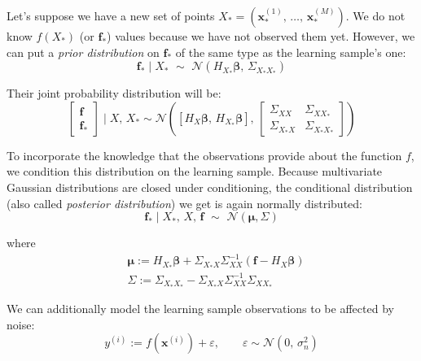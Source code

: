 \noindent
Let's suppose we have a new set of points $X_{*}=(\mathbf{x}_{*}^{(1)},\,\dots,\,\mathbf{x}_{*}^{(M)})$. We do not know $f(X_{*})$ (or $\mathbf{f}_{*}$) values because we have not observed them yet. However, we can put a \textit{prior distribution} on $\mathbf{f}_{*}$ of the same type as the learning sample's one:
\begin{equation}
    \mathbf{f}_{*}\;\vert\; X_{*} \,\,\sim\,\, \mathcal{N}(H_{X_{*}}\boldsymbol{\beta},\,\Sigma_{X_{*}X_{*}})
\end{equation}

\noindent
Their joint probability distribution will be:
\begin{equation}
    \begin{bmatrix}
    \mathbf{f} \\ \mathbf{f}_{*}
    \end{bmatrix}\;\vert\; X,\,X_{*} \sim \mathcal{N}\left([H_{X}\boldsymbol{\beta},\,H_{X_{*}}\boldsymbol{\beta}],\,\begin{bmatrix}
    \Sigma_{XX} & \Sigma_{XX_{*}} \\
    \Sigma_{X_{*}X} & \Sigma_{X_{*}X_{*}}
    \end{bmatrix}
    \right)
\end{equation}

\noindent
To incorporate the knowledge that the observations provide about the function $f$, we condition this distribution on the learning sample. Because multivariate Gaussian distributions are closed under conditioning, the conditional distribution (also called \textit{posterior distribution}) we get is again normally distributed:
%
\begin{equation}
    \mathbf{f}_{*}\;\vert\; X_{*},\,X,\,\mathbf{f}\,\,\sim\,\,\mathcal{N}(\boldsymbol{\mu},\Sigma)
\end{equation}
    
\noindent
where
%
\begin{align}
    &\boldsymbol{\mu} := H_{X_{*}}\boldsymbol{\beta} + \Sigma_{X_{*}X}\Sigma_{XX}^{-1}(\mathbf{f} - H_{X}\boldsymbol{\beta}) \\
    &\Sigma := \Sigma_{X_{*}X_{*}}-\Sigma_{X_{*}X}\Sigma_{XX}^{-1}\Sigma_{XX_{*}}
\end{align}

We can additionally model the learning sample observations to be affected by noise:
\begin{equation}
    y^{(i)}:=f(\mathbf{x}^{(i)}) + \varepsilon,\qquad \varepsilon\sim\mathcal{N}(0,\,\sigma_n^2)
\end{equation}

